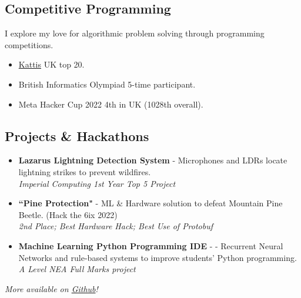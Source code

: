 \documentclass{Resume}
\begin{document}
		\subsection{Competitive Programming}
			I explore my love for algorithmic problem solving through programming competitions. 
			\begin{itemize}
			    \item \href{https://open.kattis.com/countries/GBR}{Kattis} UK top 20.
			    \item British Informatics Olympiad 5-time participant.
			    \item Meta Hacker Cup 2022 4th in UK (1028th overall).

			    
			\end{itemize}
		\subsection{Projects \& Hackathons}
			\begin{itemize}
   
            \item \textbf{Lazarus Lightning Detection System} - Microphones and LDRs locate lightning strikes to prevent wildfires.\\ \textit{Imperial Computing 1st Year Top 5 Project}
            
            \item \textbf{``Pine Protection"} - ML \& Hardware solution to defeat Mountain Pine Beetle. (Hack the 6ix 2022)\\ 
            \textit{2nd Place; Best Hardware Hack; Best Use of Protobuf}

            \item \textbf{Machine Learning Python Programming IDE} - - Recurrent Neural Networks and rule-based systems to improve students' Python programming. \\ \textit{A Level NEA Full Marks project}

    
				
			\end{itemize}
    \textit{More available on \href{https://github.com/starswap}{Github}!}
    
\end{document}
